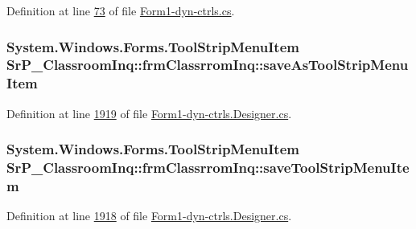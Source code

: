 \-Definition at line \hyperlink{_form1-dyn-ctrls_8cs_source_l00073}{73} of file \hyperlink{_form1-dyn-ctrls_8cs_source}{\-Form1-\/dyn-\/ctrls.\-cs}.

\hypertarget{class_sr_p___classroom_inq_1_1frm_classrrom_inq_a660ffe654aa61a06b147d2220fc5c75d}{
\subsubsection[{save\-As\-Tool\-Strip\-Menu\-Item}]{\setlength{\rightskip}{0pt plus 5cm}\-System.\-Windows.\-Forms.\-Tool\-Strip\-Menu\-Item {\bf \-Sr\-P\-\_\-\-Classroom\-Inq\-::frm\-Classrrom\-Inq\-::save\-As\-Tool\-Strip\-Menu\-Item}}}
\label{class_sr_p___classroom_inq_1_1frm_classrrom_inq_a660ffe654aa61a06b147d2220fc5c75d}


\-Definition at line \hyperlink{_form1-dyn-ctrls_8_designer_8cs_source_l01919}{1919} of file \hyperlink{_form1-dyn-ctrls_8_designer_8cs_source}{\-Form1-\/dyn-\/ctrls.\-Designer.\-cs}.

\hypertarget{class_sr_p___classroom_inq_1_1frm_classrrom_inq_a7e580a014ae78cc9e8d2ce621a2541f3}{
\subsubsection[{save\-Tool\-Strip\-Menu\-Item}]{\setlength{\rightskip}{0pt plus 5cm}\-System.\-Windows.\-Forms.\-Tool\-Strip\-Menu\-Item {\bf \-Sr\-P\-\_\-\-Classroom\-Inq\-::frm\-Classrrom\-Inq\-::save\-Tool\-Strip\-Menu\-Item}}}
\label{class_sr_p___classroom_inq_1_1frm_classrrom_inq_a7e580a014ae78cc9e8d2ce621a2541f3}


\-Definition at line \hyperlink{_form1-dyn-ctrls_8_designer_8cs_source_l01918}{1918} of file \hyperlink{_form1-dyn-ctrls_8_designer_8cs_source}{\-Form1-\/dyn-\/ctrls.\-Designer.\-cs}.

